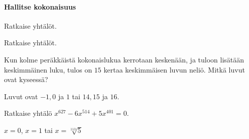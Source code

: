 \begin{tehtavasivu}
\paragraph*{Hallitse kokonaisuus}

\begin{tehtava}
Ratkaise yhtälöt.
\begin{alakohdat}
\end{alakohdat}
\begin{vastaus}
\begin{alakohdat}
\end{alakohdat}
\end{vastaus}
\end{tehtava}

\begin{tehtava}
    Ratkaise yhtälöt.
    \begin{alakohdat}
    \end{alakohdat}
    \begin{vastaus}
        \begin{alakohdat}
        \end{alakohdat}
    \end{vastaus}
\end{tehtava}

\begin{tehtava} %
Kun kolme peräkkäistä kokonaislukua kerrotaan keskenään, ja tuloon lisätään keskimmäinen luku, tulos on $15$ kertaa keskimmäisen luvun neliö. Mitkä luvut ovat kyseessä?
    \begin{vastaus}
	Luvut ovat $-1, 0$ ja $1$ tai $14, 15$ ja $16$.
    \end{vastaus}
\end{tehtava}

\begin{tehtava}
	Ratkaise yhtälö $x^{627} - 6x^{514} + 5x^{401} = 0$.
	\begin{vastaus}
		$x = 0$, $x = 1$ tai $x = \sqrt[113]{5}$
	\end{vastaus}
\end{tehtava}


\end{tehtavasivu}
